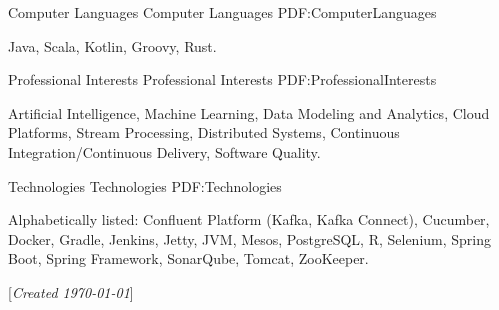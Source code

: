 \documentclass[letterpaper,MMMyyyy,nonstopmode]{simpleresumecv}
\newcommand{\CVNote}{Created {\today}}
\begin{document}
\begin{Body}

\Section
{Computer Languages}
{Computer Languages}
{PDF:ComputerLanguages}

\Entry
Java,
Scala,
Kotlin,
Groovy,
Rust.

\BigGap


\Section
{Professional Interests}
{Professional Interests}
{PDF:ProfessionalInterests}

\Entry
Artificial Intelligence,
Machine Learning,
Data Modeling and Analytics,
Cloud Platforms,
Stream Processing,
Distributed Systems,
Continuous Integration/Continuous Delivery,
Software Quality.

\BigGap


\Section
{Technologies}
{Technologies}
{PDF:Technologies}

\Entry
Alphabetically listed:\newline
Confluent Platform (Kafka, Kafka Connect),
Cucumber,
Docker,
Gradle,
Jenkins,
Jetty,
JVM,
Mesos,
PostgreSQL,
R,
Selenium,
Spring Boot,
Spring Framework,
SonarQube,
Tomcat,
ZooKeeper.
\BigGap

\end{Body}


\BigGap
\UseNoteFont%
\null\hfill%
[\textit{\CVNote}]
\end{document}
